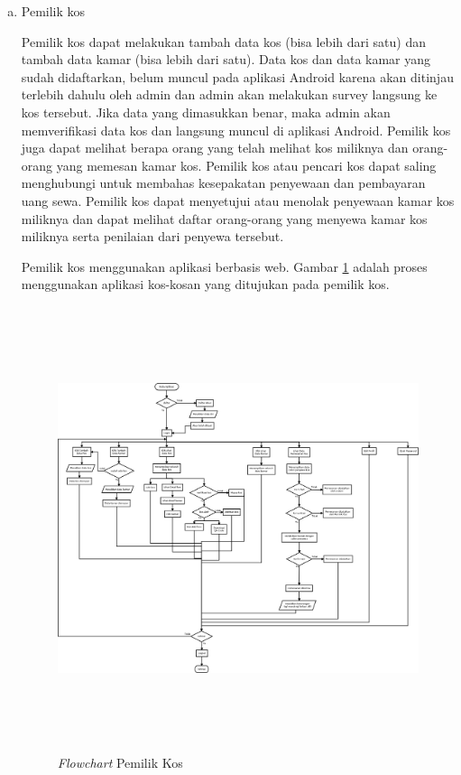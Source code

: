 		\begin{enumerate}[a.]
			\item Pemilik kos
			
			Pemilik kos dapat melakukan tambah data kos (bisa lebih dari satu) dan tambah data kamar (bisa lebih dari satu). Data kos dan data kamar yang sudah didaftarkan, belum muncul pada aplikasi Android karena akan ditinjau terlebih dahulu oleh admin dan admin akan melakukan survey langsung ke kos tersebut. Jika data yang dimasukkan benar, maka admin akan memverifikasi data kos dan langsung muncul di aplikasi Android. Pemilik kos juga dapat melihat berapa orang yang telah melihat kos miliknya dan orang-orang yang memesan kamar kos. Pemilik kos atau pencari kos dapat saling menghubungi untuk membahas kesepakatan penyewaan dan pembayaran uang sewa. Pemilik kos dapat menyetujui atau menolak penyewaan kamar kos miliknya dan dapat melihat daftar orang-orang yang menyewa kamar kos miliknya serta penilaian dari penyewa tersebut.
			
			Pemilik kos menggunakan aplikasi berbasis web. Gambar \ref{flow1} adalah proses menggunakan aplikasi kos-kosan yang ditujukan pada pemilik kos.
			\begin{landscape}
				\begin{figure}[H]
					\centering
					\includegraphics [width = 24cm, height= 13cm]{gambar/ocl/diagrampemilik}
					\caption{\textit{Flowchart} Pemilik Kos}
					\label{flow1}
				\end{figure}
			\end{landscape}
		

\end{enumerate}

